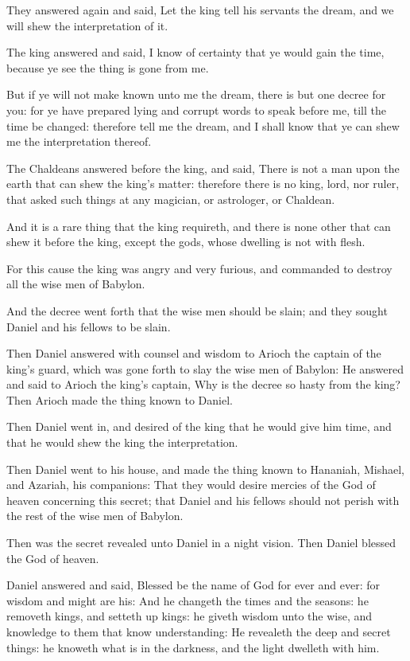 \Verse They answered again and said, Let the king tell his servants the dream, and we will shew the interpretation of it.

\Verse The king answered and said, I know of certainty that ye would gain the time, because ye see the thing is gone from me.

\Verse But if ye will not make known unto me the dream, there is but one decree for you: for ye have prepared lying and corrupt words to speak before me, till the time be changed: therefore tell me the dream, and I shall know that ye can shew me the interpretation thereof.

\Verse The Chaldeans answered before the king, and said, There is not a man upon the earth that can shew the king's matter: therefore there is no king, lord, nor ruler, that asked such things at any magician, or astrologer, or Chaldean.

\Verse And it is a rare thing that the king requireth, and there is none other that can shew it before the king, except the gods, whose dwelling is not with flesh.

\Verse For this cause the king was angry and very furious, and commanded to destroy all the wise men of Babylon.

\Verse And the decree went forth that the wise men should be slain; and they sought Daniel and his fellows to be slain.

\Verse Then Daniel answered with counsel and wisdom to Arioch the captain of the king's guard, which was gone forth to slay the wise men of Babylon: \Verse He answered and said to Arioch the king's captain, Why is the decree so hasty from the king? Then Arioch made the thing known to Daniel.

\Verse Then Daniel went in, and desired of the king that he would give him time, and that he would shew the king the interpretation.

\Verse Then Daniel went to his house, and made the thing known to Hananiah, Mishael, and Azariah, his companions: \Verse That they would desire mercies of the God of heaven concerning this secret; that Daniel and his fellows should not perish with the rest of the wise men of Babylon.

\Verse Then was the secret revealed unto Daniel in a night vision. Then Daniel blessed the God of heaven.

\Verse Daniel answered and said, Blessed be the name of God for ever and ever: for wisdom and might are his: \Verse And he changeth the times and the seasons: he removeth kings, and setteth up kings: he giveth wisdom unto the wise, and knowledge to them that know understanding: \Verse He revealeth the deep and secret things: he knoweth what is in the darkness, and the light dwelleth with him.

